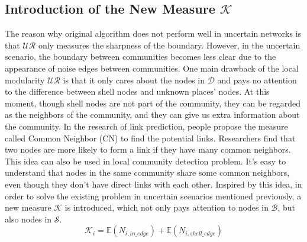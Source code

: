 \documentclass[\main/thesis.tex]{subfiles}
\begin{document}
\subsection{Introduction of the New Measure $\mathcal{K}$}
The reason why original algorithm does not perform well in uncertain networks is that $\mathcal{UR}$ only measures the sharpness of the boundary. However, in the uncertain scenario, the boundary between communities becomes less clear due to the appearance of noise edges between communities. One main drawback of the local modularity $\mathcal{UR}$ is that it only cares about the nodes in $\mathcal{D}$ and pays no attention to the difference between shell nodes and unknown places' nodes. At this moment, though shell nodes are not part of the community, they can be regarded as the neighbors of the community, and they can give us extra information about the community. In the research of link prediction, people propose the measure called Common Neighbor (CN) to find the potential links. Researchers find that two nodes are more likely to form a link if they have many common neighbors. This idea can also be used in local community detection problem. It's easy to understand that nodes in the same community share some common neighbors, even though they don't have direct links with each other. Inspired by this idea, in order to solve the existing problem in uncertain scenarios mentioned previously, a new measure $\mathcal{K}$ is introduced, which not only pays attention to nodes in $\mathcal{B}$, but also nodes in $\mathcal{S}$.
\begin{equation}
\mathcal{K}_i = \mathbb{E}(N_{i,in\_edge}) + \mathbb{E}(N_{i,shell\_edge})
\end{equation}
\end{document}
